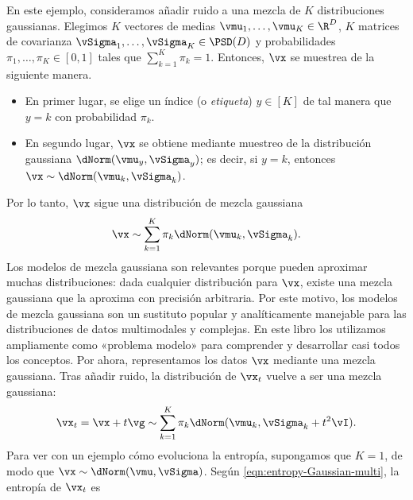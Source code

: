\documentclass[../../book-main.tex]{subfiles}
\begin{document}
\begin{example}\label{ex:gaussian_mixture}
    En este ejemplo, consideramos añadir ruido a una mezcla de \(K\)
    distribuciones gaussianas. Elegimos \(K\) vectores de medias
    \(\vmu_{1}, \dots, \vmu_{K} \in \R^{D}\), \(K\) matrices de covarianza
    \(\vSigma_{1}, \dots, \vSigma_{K} \in \PSD(D)\) y
    probabilidades \(\pi_{1}, \dots, \pi_{K} \in [0, 1]\) tales que
    \(\sum_{k = 1}^{K}\pi_{k} = 1\). Entonces, \(\vx\) se muestrea de la
    siguiente manera.
    \begin{itemize}
        \item En primer lugar, se elige un índice (o \textit{etiqueta}) \(y \in [K]\)
            de tal manera que \(y = k\) con probabilidad \(\pi_{k}\). 
        \item En segundo lugar, \(\vx\) se obtiene mediante muestreo de la distribución gaussiana
            \(\dNorm(\vmu_{y}, \vSigma_{y})\); es decir, si \(y = k\), entonces
            \(\vx \sim \dNorm(\vmu_{k}, \vSigma_{k})\). 
    \end{itemize}
    Por lo tanto, \(\vx\) sigue una distribución de mezcla gaussiana
    \begin{equation}
        \vx \sim \sum_{k = 1}^{K}\pi_{k}\dNorm(\vmu_{k}, \vSigma_{k}).
    \end{equation}
    Los modelos de mezcla gaussiana son relevantes porque pueden aproximar
    muchas distribuciones: dada cualquier distribución para \(\vx\), existe
    una mezcla gaussiana que la aproxima con precisión arbitraria.
    Por este motivo, los modelos de mezcla gaussiana son un sustituto popular y
    analíticamente manejable para las distribuciones de datos multimodales y complejas.
    En este libro los utilizamos ampliamente como «problema modelo» para comprender 
    y desarrollar casi todos los conceptos. Por ahora, representamos los datos \(\vx\) 
    mediante una mezcla gaussiana. Tras añadir
    ruido, la distribución de \(\vx_{t}\) vuelve a ser una mezcla gaussiana:
    \begin{equation}
        \vx_{t} = \vx + t\vg \sim \sum_{k =
        1}^{K}\pi_{k}\dNorm(\vmu_{k}, \vSigma_{k} + t^{2}\vI).
    \end{equation}
    Para ver con un ejemplo cómo evoluciona la entropía, supongamos que \(K = 1\), de modo que
    \(\vx \sim \dNorm(\vmu, \vSigma)\). Según
    \eqref{eqn:entropy-Gaussian-multi}, la entropía de \(\vx_{t}\) es
    \begin{equation}

\end{equation}
\end{example}
\end{document}
